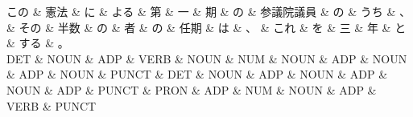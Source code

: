 \documentclass[tikz,border=5pt]{standalone}
\begin{document}
\normalsize
\begin{dependency}[edge unit distance=12.0pt]
    \begin{deptext}[column sep=1em]
        この \& 憲法 \& に \& よる \& 第 \& 一 \& 期 \& の \& 参議院議員 \& の \& うち \& 、 \& その \& 半数 \& の \& 者 \& の \& 任期 \& は \& 、 \& これ \& を \& 三 \& 年 \& と \& する \& 。\\
        DET \& NOUN \& ADP \& VERB \& NOUN \& NUM \& NOUN \& ADP \& NOUN \& ADP \& NOUN \& PUNCT \& DET \& NOUN \& ADP \& NOUN \& ADP \& NOUN \& ADP \& PUNCT \& PRON \& ADP \& NUM \& NOUN \& ADP \& VERB \& PUNCT\\
    \end{deptext}
\end{dependency}
\end{document}
